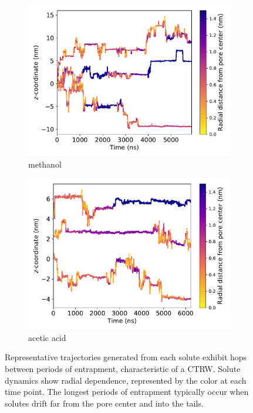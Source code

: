 \documentclass[aps,pre,preprint,groupedaddress]{revtex4-2}
\begin{document}
\begin{figure}
\begin{subfigure}{0.45\textwidth}
  \includegraphics[width=\textwidth]{MET_trajectories.pdf}
  \caption{methanol}\label{fig:MET_trajectories}
  \end{subfigure}
  \begin{subfigure}{0.45\textwidth}
  \includegraphics[width=\textwidth]{ACH_trajectories.pdf}
  \caption{acetic acid}\label{fig:ACH_trajectories}
  \end{subfigure}
  \caption{Representative trajectories generated from each solute exhibit hops 
  between periods of entrapment, characteristic of a CTRW. Solute dynamics show
  radial dependence, represented by the color at each time point. The longest 
  periods of entrapment typically occur when solutes drift far from the pore 
  center and into the tails.
  }\label{fig:solute_trajectories}
  \end{figure}
  
\end{document}
